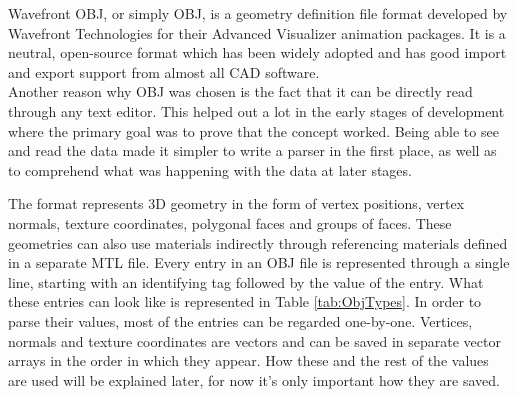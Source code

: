 Wavefront OBJ, or simply OBJ, is a geometry definition file format developed by Wavefront Technologies for their Advanced Visualizer animation packages\cite{bib:OBJ}. It is a neutral, open-source format which has been widely adopted and has good import and export support from almost all \acs{CAD} software.\\
Another reason why OBJ was chosen is the fact that it can be directly read through any text editor. This helped out a lot in the early stages of development where the primary goal was to prove that the concept worked. Being able to see and read the data made it simpler to write a parser in the first place, as well as to comprehend what was happening with the data at later stages.\\
\begin{table}[htbp]
	\centering 
	\caption[ObjTypes]{Relevant types in OBJ format}
	\label{tab:ObjTypes}
\end{table}
The format represents 3D geometry in the form of vertex positions, vertex normals, texture coordinates, polygonal faces and groups of faces. These geometries can also use materials indirectly through referencing materials defined in a separate \acs{MTL} file. Every entry in an OBJ file is represented through a single line, starting with an identifying tag followed by the value of the entry. What these entries can look like is represented in Table \ref{tab:ObjTypes}.
In order to parse their values, most of the entries can be regarded one-by-one. Vertices, normals and texture coordinates are vectors and can be saved in separate vector arrays in the order in which they appear. How these and the rest of the values are used will be explained later, for now it's only important how they are saved.\\
